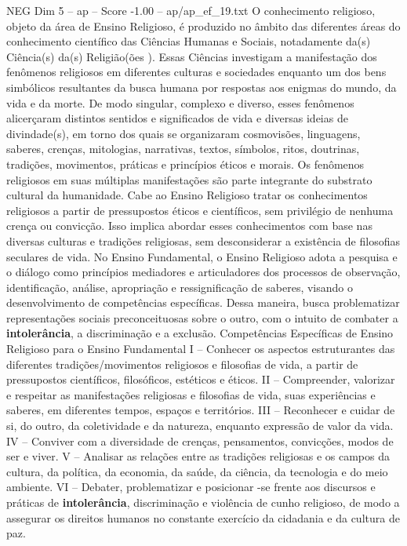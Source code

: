\begin{textsample}{NEG Dim 5 – ap – Score -1.00 – ap/ap\_ef\_19.txt}
O conhecimento religioso, objeto da área de Ensino Religioso, é produzido no âmbito das diferentes áreas do conhecimento científico das Ciências Humanas e Sociais, notadamente da(s) Ciência(s) da(s) Religião(ões ).
Essas Ciências investigam a manifestação dos fenômenos religiosos em diferentes culturas e sociedades enquanto um dos bens simbólicos resultantes da busca humana por respostas aos enigmas do mundo, da vida e da morte.
De modo singular, complexo e diverso, esses fenômenos alicerçaram distintos sentidos e significados de vida e diversas ideias de divindade(s), em torno dos quais se organizaram cosmovisões, linguagens, saberes, crenças, mitologias, narrativas, textos, símbolos, ritos, doutrinas, tradições, movimentos, práticas e princípios éticos e morais.
Os fenômenos religiosos em suas múltiplas manifestações são parte integrante do substrato cultural da humanidade.
Cabe ao Ensino Religioso tratar os conhecimentos religiosos a partir de pressupostos éticos e científicos, sem privilégio de nenhuma crença ou convicção.
Isso implica abordar esses conhecimentos com base nas diversas culturas e tradições religiosas, sem desconsiderar a existência de filosofias seculares de vida.
No Ensino Fundamental, o Ensino Religioso adota a pesquisa e o diálogo como princípios mediadores e articuladores dos processos de observação, identificação, análise, apropriação e ressignificação de saberes, visando o desenvolvimento de competências específicas.
Dessa maneira, busca problematizar representações sociais preconceituosas sobre o outro, com o intuito de combater a \textbf{intolerância}, a discriminação e a exclusão.
Competências Específicas de Ensino Religioso para o Ensino Fundamental I – Conhecer os aspectos estruturantes das diferentes tradições/movimentos religiosos e filosofias de vida, a partir de pressupostos científicos, filosóficos, estéticos e éticos.
II – Compreender, valorizar e respeitar as manifestações religiosas e filosofias de vida, suas experiências e saberes, em diferentes tempos, espaços e territórios.
III – Reconhecer e cuidar de si, do outro, da coletividade e da natureza, enquanto expressão de valor da vida.
IV – Conviver com a diversidade de crenças, pensamentos, convicções, modos de ser e viver.
V – Analisar as relações entre as tradições religiosas e os campos da cultura, da política, da economia, da saúde, da ciência, da tecnologia e do meio ambiente.
VI – Debater, problematizar e posicionar -se frente aos discursos e práticas de \textbf{intolerância}, discriminação e violência de cunho religioso, de modo a assegurar os direitos humanos no constante exercício da cidadania e da cultura de paz.

\end{textsample}
